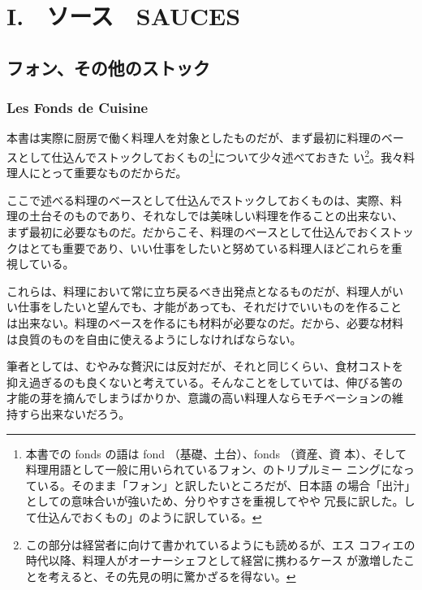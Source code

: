 \hypertarget{i.ux30bdux30fcux30b9sauces}{%
\chapter{I.　ソース　SAUCES}\label{i.ux30bdux30fcux30b9sauces}}

\hypertarget{ux30d5ux30a9ux30f3ux305dux306eux4ed6ux306eux30b9ux30c8ux30c3ux30af}{%
\section{フォン、その他のストック}\label{ux30d5ux30a9ux30f3ux305dux306eux4ed6ux306eux30b9ux30c8ux30c3ux30af}}

\hypertarget{les-fonds-de-cuisine}{%
\subsection{Les Fonds de Cuisine}\label{les-fonds-de-cuisine}}

 

本書は実際に厨房で働く料理人を対象としたものだが、まず最初に料理のベー
スとして仕込んでストックしておくもの\footnote{本書での fonds の語は fond
  （基礎、土台）、fonds （資産、資
  本）、そして料理用語として一般に用いられているフォン、のトリプルミー
  ニングになっている。そのまま「フォン」と訳したいところだが、日本語
  の場合「出汁」としての意味合いが強いため、分りやすさを重視してやや
  冗長に訳した。して仕込んでおくもの」のように訳している。}について少々述べておきた
い\footnote{この部分は経営者に向けて書かれているようにも読めるが、エス
  コフィエの時代以降、料理人がオーナーシェフとして経営に携わるケース
  が激増したことを考えると、その先見の明に驚かざるを得ない。}。我々料理人にとって重要なものだからだ。

ここで述べる料理のベースとして仕込んでストックしておくものは、実際、料
理の土台そのものであり、それなしでは美味しい料理を作ることの出来ない、
まず最初に必要なものだ。だからこそ、料理のベースとして仕込んでおくストッ
クはとても重要であり、いい仕事をしたいと努めている料理人ほどこれらを重
視している。

これらは、料理において常に立ち戻るべき出発点となるものだが、料理人がい
い仕事をしたいと望んでも、才能があっても、それだけでいいものを作ること
は出来ない。料理のベースを作るにも材料が必要なのだ。だから、必要な材料
は良質のものを自由に使えるようにしなければならない。

筆者としては、むやみな贅沢には反対だが、それと同じくらい、食材コストを
抑え過ぎるのも良くないと考えている。そんなことをしていては、伸びる筈の
才能の芽を摘んでしまうばかりか、意識の高い料理人ならモチベーションの維
持すら出来ないだろう。

